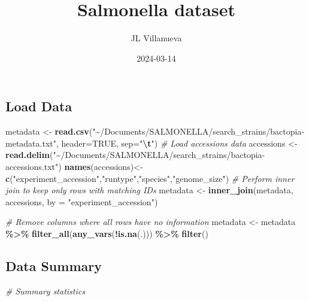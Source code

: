 \documentclass[
]{article}
\title{Salmonella dataset}
\author{JL Villanueva}
\date{2024-03-14}
\newenvironment{Shaded}{\begin{snugshade}}{\end{snugshade}}
\newcommand{\AttributeTok}[1]{\textcolor[rgb]{0.13,0.29,0.53}{#1}}
\newcommand{\CommentTok}[1]{\textcolor[rgb]{0.56,0.35,0.01}{\textit{#1}}}
\newcommand{\ConstantTok}[1]{\textcolor[rgb]{0.56,0.35,0.01}{#1}}
\newcommand{\FunctionTok}[1]{\textcolor[rgb]{0.13,0.29,0.53}{\textbf{#1}}}
\newcommand{\NormalTok}[1]{#1}
\newcommand{\OtherTok}[1]{\textcolor[rgb]{0.56,0.35,0.01}{#1}}
\newcommand{\SpecialCharTok}[1]{\textcolor[rgb]{0.81,0.36,0.00}{\textbf{#1}}}
\newcommand{\StringTok}[1]{\textcolor[rgb]{0.31,0.60,0.02}{#1}}
\begin{document}
\maketitle

\hypertarget{load-data}{%
\subsection{Load Data}\label{load-data}}

\begin{Shaded}
\begin{Highlighting}[]
\NormalTok{metadata }\OtherTok{\textless{}{-}} \FunctionTok{read.csv}\NormalTok{(}\StringTok{"\textasciitilde{}/Documents/SALMONELLA/search\_strains/bactopia{-}metadata.txt"}\NormalTok{, }\AttributeTok{header=}\ConstantTok{TRUE}\NormalTok{, }\AttributeTok{sep=}\StringTok{"}\SpecialCharTok{\textbackslash{}t}\StringTok{"}\NormalTok{)}
\CommentTok{\# Load accessions data}
\NormalTok{accessions }\OtherTok{\textless{}{-}} \FunctionTok{read.delim}\NormalTok{(}\StringTok{"\textasciitilde{}/Documents/SALMONELLA/search\_strains/bactopia{-}accessions.txt"}\NormalTok{)}
\FunctionTok{names}\NormalTok{(accessions)}\OtherTok{\textless{}{-}}\FunctionTok{c}\NormalTok{(}\StringTok{"experiment\_accession"}\NormalTok{,}\StringTok{"runtype"}\NormalTok{,}\StringTok{"species"}\NormalTok{,}\StringTok{"genome\_size"}\NormalTok{)}
\CommentTok{\# Perform inner join to keep only rows with matching IDs}
\NormalTok{metadata }\OtherTok{\textless{}{-}} \FunctionTok{inner\_join}\NormalTok{(metadata, accessions, }\AttributeTok{by =} \StringTok{"experiment\_accession"}\NormalTok{)}

\CommentTok{\# Remove columns where all rows have no information}
\NormalTok{metadata }\OtherTok{\textless{}{-}}\NormalTok{ metadata }\SpecialCharTok{\%\textgreater{}\%}
  \FunctionTok{filter\_all}\NormalTok{(}\FunctionTok{any\_vars}\NormalTok{(}\SpecialCharTok{!}\FunctionTok{is.na}\NormalTok{(.))) }\SpecialCharTok{\%\textgreater{}\%}
  \FunctionTok{filter}\NormalTok{()}
\end{Highlighting}
\end{Shaded}

\hypertarget{data-summary}{%
\subsection{Data Summary}\label{data-summary}}

\begin{Shaded}
\begin{Highlighting}[]
\CommentTok{\# Summary statistics}
\end{Highlighting}
\end{Shaded}
\end{document}
